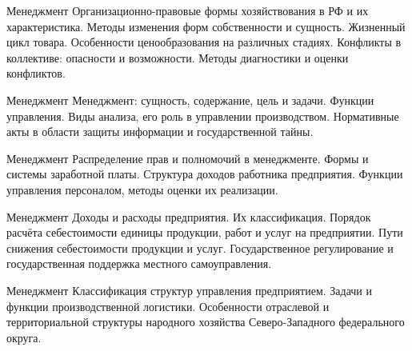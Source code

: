 \documentclass[
	11pt,
	a4paper,
	]
	{article}
\begin{document}
\vfill



\begin{minipage}[t][\miniH]{\miniL}\centering
	 {Менеджмент}
		{
			Организационно-правовые формы хозяйствования в РФ и их характеристика. Методы изменения форм собственности и сущность.
		}{
			Жизненный цикл товара. Особенности ценообразования на различных стадиях.
		}{
			Конфликты в коллективе: опасности и возможности. Методы диагностики и оценки конфликтов.
		}
	\lowGE
\end{minipage}

\vfill



\begin{minipage}[t][\miniH]{\miniL}\centering
	 {Менеджмент}
		{
			Менеджмент: сущность, содержание, цель и задачи. Функции управления.
		}{
			Виды анализа, его роль в управлении производством.
		}{
			Нормативные акты в области защиты информации и государственной тайны.
		}
	\lowGE
\end{minipage}





\begin{minipage}[t][\miniH]{\miniL}\centering
	 {Менеджмент}
		{
			Распределение прав и полномочий в менеджменте.
		}{
			Формы и системы заработной платы. Структура доходов работника предприятия.
		}{
			Функции управления персоналом, методы оценки их реализации.
		}
	\lowGE
\end{minipage}

\vfill



\begin{minipage}[t][\miniH]{\miniL}\centering
	 {Менеджмент}
		{
			Доходы и расходы предприятия. Их классификация.
		}{
			Порядок расчёта себестоимости единицы продукции, работ и услуг на предприятии. Пути снижения себестоимости продукции и услуг.
		}{
			Государственное регулирование и государственная поддержка местного самоуправления.
		}
	\lowGE
\end{minipage}

\vfill



\begin{minipage}[t][\miniH]{\miniL}\centering
	 {Менеджмент}
		{
			Классификация структур управления предприятием.
		}{
			Задачи и функции производственной логистики.
		}{
			Особенности отраслевой и территориальной структуры народного хозяйства Северо-Западного федерального округа.
		}
	\lowGE
\end{minipage}



	
\end{document}
